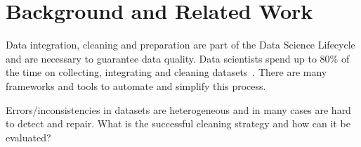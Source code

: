 \chapter{Background and Related Work} 

\label{sec:background}
Data integration, cleaning and preparation are part of the Data Science Lifecycle and are necessary to guarantee data quality. 
Data scientists spend up to 80\% of the time on collecting, integrating and cleaning datasets~\cite{80cleansurvey}. There are many frameworks and tools to automate and simplify this process. 

Errors/inconsistencies in datasets are heterogeneous and in many cases are hard to detect and repair. What is the successful cleaning strategy and how can it be evaluated? 





